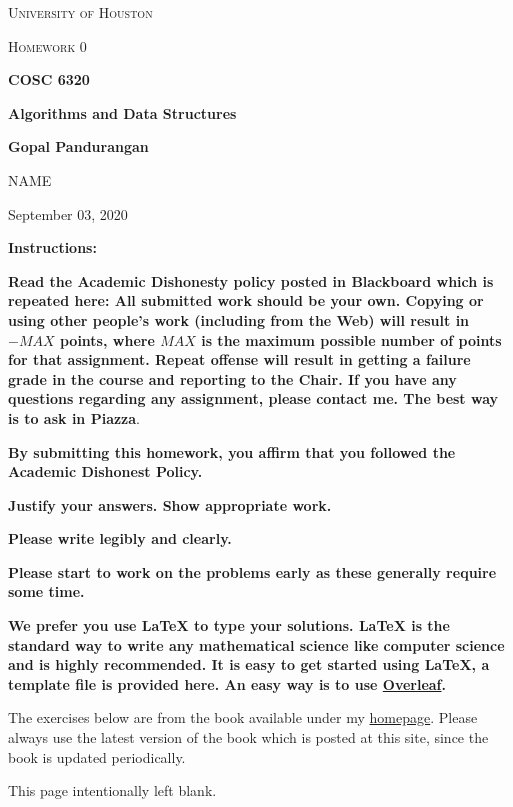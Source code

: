 \documentclass[a4paper]{article}
\begin{document}
\begin{titlepage}
    \begin{center}
        {\scshape\LARGE University of Houston\par}
        \vspace{1cm}
        {\scshape\Large Homework 0 \par}
        \vspace{1.5cm}
        {\huge\bfseries COSC 6320 \par}
        {\huge\bfseries Algorithms and Data Structures \par}
        \vspace{0.5cm}
        {\large\bfseries Gopal Pandurangan\par}
        \vspace{2cm}
        {\Large NAME\par}
        \vspace{0.5cm}
        {\large \par} September 03, 2020
    \end{center}

    \textbf{Instructions:}

    \textbf{Read the Academic Dishonesty policy posted in Blackboard which is repeated here:
        All submitted work should be  your own. Copying or using other people's work (including  from the Web) will result in $-MAX$ points, where $MAX$ is the maximum possible number of points for that assignment. Repeat offense will result in getting a failure grade in the course and reporting to the Chair. If you have any questions regarding any assignment, please contact me. The best way is to ask in Piazza}.


    \textbf{By submitting this homework, you affirm that you followed the Academic Dishonest Policy.}

    \textbf{Justify your answers. Show appropriate work.}

    \textbf{Please write legibly and clearly.}

    \textbf{Please start to work on the problems early as these generally require some time.}

    \textbf{We prefer you use LaTeX to type your solutions. LaTeX is the standard way to write any mathematical science like
        computer science and is highly recommended. It is easy to get started using LaTeX, a template file is provided here.
        An easy way is to use \href{https://www.overleaf.com/}{Overleaf}.}

    The exercises below are from the book available under my \href{https://sites.google.com/site/gopalpandurangan/home/algorithms-course}{homepage}. Please always use the latest version of the book which is posted at this site, since the book is updated periodically.
    \vfill

\end{titlepage}
\vspace*{\fill}\begin{center}{\Huge This page intentionally left blank.}\end{center}\vspace*{\fill}\thispagestyle{empty}\clearpage
{}
\end{document}
